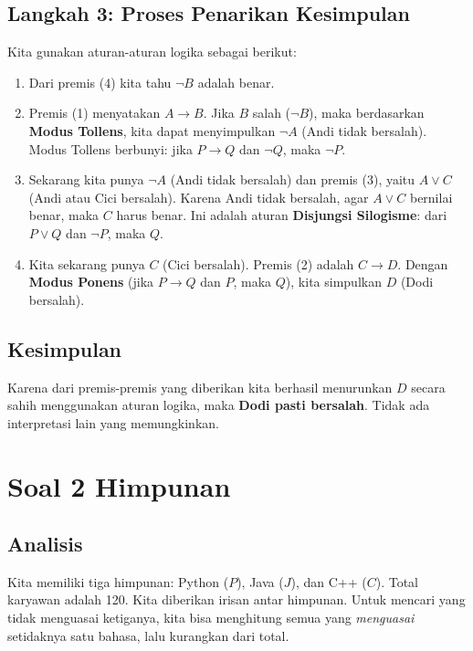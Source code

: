 \documentclass[12pt,a4paper]{article}
\begin{document}
\subsection*{Langkah 3: Proses Penarikan Kesimpulan}
Kita gunakan aturan-aturan logika sebagai berikut:

\begin{enumerate}
    \item Dari premis (4) kita tahu $\neg B$ adalah benar.
    \item Premis (1) menyatakan $A \rightarrow B$. Jika $B$ salah ($\neg B$), maka berdasarkan \textbf{Modus Tollens}, kita dapat menyimpulkan $\neg A$ (Andi tidak bersalah). Modus Tollens berbunyi: jika $P \rightarrow Q$ dan $\neg Q$, maka $\neg P$.
    \item Sekarang kita punya $\neg A$ (Andi tidak bersalah) dan premis (3), yaitu $A \lor C$ (Andi atau Cici bersalah). Karena Andi tidak bersalah, agar $A \lor C$ bernilai benar, maka $C$ harus benar. Ini adalah aturan \textbf{Disjungsi Silogisme}: dari $P \lor Q$ dan $\neg P$, maka $Q$.
    \item Kita sekarang punya $C$ (Cici bersalah). Premis (2) adalah $C \rightarrow D$. Dengan \textbf{Modus Ponens} (jika $P \rightarrow Q$ dan $P$, maka $Q$), kita simpulkan $D$ (Dodi bersalah).
\end{enumerate}

\subsection*{Kesimpulan}
Karena dari premis-premis yang diberikan kita berhasil menurunkan $D$ secara sahih menggunakan aturan logika, maka \textbf{Dodi pasti bersalah}. Tidak ada interpretasi lain yang memungkinkan.

\newpage
\section*{Soal 2 Himpunan}
\subsection*{Analisis}
Kita memiliki tiga himpunan: Python ($P$), Java ($J$), dan C++ ($C$). Total karyawan adalah 120. Kita diberikan irisan antar himpunan. Untuk mencari yang tidak menguasai ketiganya, kita bisa menghitung semua yang \emph{menguasai} setidaknya satu bahasa, lalu kurangkan dari total.
\end{document}
